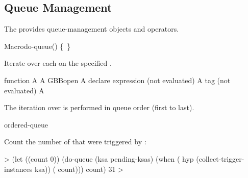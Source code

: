 \documentclass[10pt,twoside,english,pdftex]{article}
\begin{document}

\T\markright{}%
\T\pagestyle{plain}
\T\clearpage
\W{}
\T\pagestyle{fancy}
\T\thispagestyle{fancybottom}
\T\global\def\fnlastname{ }%
\subsection{Queue Management}
\label{sec:queue}%

%
%
%
The   provides queue-management objects and
operators.

\W\entities
\T\clearpage


\begin{functiondoc}{Macro}{do-queue}{()
    \superstar{} 
    \mbox{\{ \vbar{} \}\superstar}}
%
%

\fnsyntax

\fnpurpose Iterate over each  on the
specified .

\fnpackage {}

\fnmodule {}

\fnargs
\begin{args}{function}
\arg[var] A 
\arg[queue] A GBBopen 
\arg[declaration] A declare expression (not evaluated)
\arg[tag] A  tag (not evaluated)
\arg[form] A 
\end{args}

\fndescription The iteration over  is performed
in queue order (first to last).

\begin{alsos}{ordered-queue}
\also[queue]
\end{alsos}

\fnexample
{}%
%
%
%
Count the number of  that were triggered by :
%
\W\supp
\begin{example}
  > (let ((count 0))
      (do-queue (ksa pending-ksas)
        (when ( hyp (collect-trigger-instances ksa))
          ( count)))
       count)
  31
  >
\end{example}

\end{functiondoc}
\end{document}
